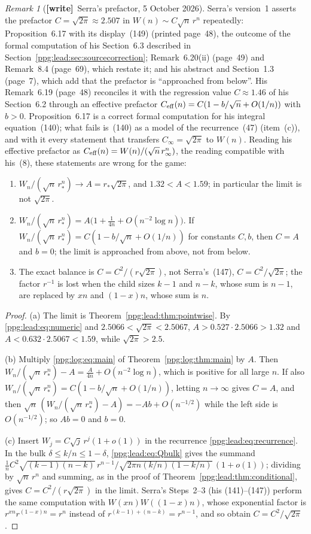 \documentclass[11pt,letterpaper]{article}
\theoremstyle{remark}\newtheorem{remark}[theorem]{Remark}
\numberwithin{equation}{section}
\newcommand{\wtag}{\textup{\textbf{[write]}}}
\begin{document}
\begin{remark}[\wtag\ Serra's prefactor, 5 October 2026]\label{ppg:lead:rem:serra}
Serra's version~1 \cite{serra} asserts the prefactor $C=\sqrt{2\pi}\approx2.507$ in $W(n)\sim C\sqrt n\,r^n$ repeatedly: Proposition~6.17 with its display~(149) (printed page~48), the outcome of the formal computation of his Section~6.3 described in Section~\ref{ppg:lead:sec:sourcecorrection}; Remark~6.20(ii) (page~49) and Remark~8.4 (page~69), which restate it; and his abstract and Section~1.3 (page~7), which add that the prefactor is ``approached from below''. His Remark~6.19 (page~48) reconciles it with the regression value $C\approx1.46$ of his Section~6.2 through an effective prefactor $C_{\rm eff}(n)=C(1-b/\sqrt n+O(1/n))$ with $b>0$. Proposition~6.17 is a correct formal computation for his integral equation~(140); what fails is~(140) as a model of the recurrence~(47) (item~(c)), and with it every statement that transfers $C_\infty=\sqrt{2\pi}$ to $W(n)$. Reading his effective prefactor as $C_{\rm eff}(n)=W(n)/(\sqrt n\,r_\infty^n)$, the reading compatible with his~(8), these statements are wrong for the game:
\begin{enumerate}[label=(\alph*)]
\item $W_n/(\sqrt n\,r_*^n)\to A=r_*\sqrt{2\pi}$, and $1.32<A<1.59$; in particular the limit is not $\sqrt{2\pi}$.
\item $W_n/(\sqrt n\,r_*^n)=A\bigl(1+\frac1{4n}+O(n^{-2}\log n)\bigr)$. If $W_n/(\sqrt n\,r_*^n)=C(1-b/\sqrt n+O(1/n))$ for constants $C,b$, then $C=A$ and $b=0$; the limit is approached from above, not from below.
\item The exact balance is $C=C^2/(r\sqrt{2\pi})$, not Serra's~(147), $C=C^2/\sqrt{2\pi}$; the factor $r^{-1}$ is lost when the child sizes $k-1$ and $n-k$, whose sum is $n-1$, are replaced by $xn$ and $(1-x)n$, whose sum is $n$.
\end{enumerate}
\end{remark}
\begin{proof}
(a) The limit is Theorem~\ref{ppg:lead:thm:pointwise}. By \eqref{ppg:lead:eq:numeric} and $2.5066<\sqrt{2\pi}<2.5067$, $A>0.527\cdot2.5066>1.32$ and $A<0.632\cdot2.5067<1.59$, while $\sqrt{2\pi}>2.5$.

(b) Multiply \eqref{ppg:log:eq:main} of Theorem~\ref{ppg:log:thm:main} by $A$. Then $W_n/(\sqrt n\,r_*^n)-A=\frac A{4n}+O(n^{-2}\log n)$, which is positive for all large $n$. If also $W_n/(\sqrt n\,r_*^n)=C(1-b/\sqrt n+O(1/n))$, letting $n\to\infty$ gives $C=A$, and then $\sqrt n\,(W_n/(\sqrt n\,r_*^n)-A)=-Ab+O(n^{-1/2})$ while the left side is $O(n^{-1/2})$; so $Ab=0$ and $b=0$.

(c) Insert $W_j=C\sqrt j\,r^j(1+o(1))$ in the recurrence \eqref{ppg:lead:eq:recurrence}. In the bulk $\delta\le k/n\le1-\delta$, \eqref{ppg:lead:eq:Qbulk} gives the summand $\frac1nC^2\sqrt{(k-1)(n-k)}\,r^{n-1}/\sqrt{2\pi n(k/n)(1-k/n)}\,(1+o(1))$; dividing by $\sqrt n\,r^n$ and summing, as in the proof of Theorem~\ref{ppg:lead:thm:conditional}, gives $C=C^2/(r\sqrt{2\pi})$ in the limit. Serra's Steps~2--3 (his (141)--(147)) perform the same computation with $W(xn)W((1-x)n)$, whose exponential factor is $r^{xn}r^{(1-x)n}=r^n$ instead of $r^{(k-1)+(n-k)}=r^{n-1}$, and so obtain $C=C^2/\sqrt{2\pi}$.
\end{proof}
\end{document}
